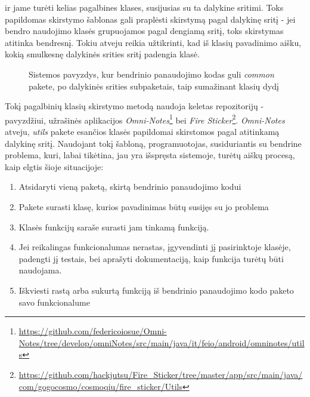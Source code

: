ir jame turėti kelias pagalbines klases, susijusias su ta dalykine sritimi.
Toks papildomas skirstymo šablonas gali praplėsti skirstymą
pagal dalykinę sritį - jei bendro naudojimo klasės grupuojamos pagal dengiamą sritį, toks skirstymas atitinka bendresnį.
Tokiu atveju reikia užtikrinti, kad iš klasių pavadinimo aišku, kokią smulkesnę dalykinės srities sritį padengia klasė.
\begin{figure}[H]
\snugshade
{}
\endsnugshade
\caption{Sistemos pavyzdys, kur bendrinio panaudojimo kodas guli \textit{common} pakete, po dalykinės srities subpaketais, taip sumažinant klasių dydį }
\end{figure}
Tokį pagalbinių klasių skirstymo metodą naudoja keletas repozitorijų - pavyzdžiui, užrašinės aplikacijos \textit{Omni-Notes}\footnote{\url{https://github.com/federicoiosue/Omni-Notes/tree/develop/omniNotes/src/main/java/it/feio/android/omninotes/utils}} bei
\textit{Fire Sticker}\footnote{\url{https://github.com/hackjutsu/Fire_Sticker/tree/master/app/src/main/java/com/gogocosmo/cosmoqiu/fire_sticker/Utils}}.
\textit{Omni-Notes} atveju, \textit{utils} pakete esančios klasės papildomai skirstomos pagal atitinkamą dalykinę sritį.
Naudojant tokį šabloną, programuotojas, susiduriantis su bendrine problema, kuri, labai tikėtina, jau yra išspręsta sistemoje, turėtų
aiškų procesą, kaip elgtis šioje situacijoje:
\begin{enumerate}
    \item Atsidaryti vieną paketą, skirtą bendrinio panaudojimo kodui
    \item Pakete surasti klasę, kurios pavadinimas būtų susijęs su jo problema
    \item Klasės funkcijų saraše surasti jam tinkamą funkciją.
    \item Jei reikalingas funkcionalumas nerastas, įgyvendinti jį pasirinktoje klasėje, padengti jį testais,
    bei aprašyti dokumentaciją, kaip funkcija turėtų būti naudojama.
    \item Iškviesti rastą arba sukurtą funkciją iš bendrinio panaudojimo kodo paketo savo funkcionalume
\end{enumerate}


